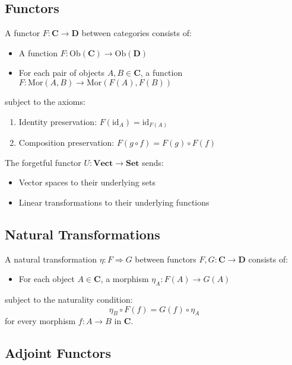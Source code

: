\subsection{Functors}

\begin{definition}[Functor]
A functor $F: \mathbf{C} \to \mathbf{D}$ between categories consists of:
\begin{itemize}
\item A function $F: \text{Ob}(\mathbf{C}) \to \text{Ob}(\mathbf{D})$
\item For each pair of objects $A, B \in \mathbf{C}$, a function $F: \text{Mor}(A, B) \to \text{Mor}(F(A), F(B))$
\end{itemize}
subject to the axioms:
\begin{enumerate}
\item Identity preservation: $F(\text{id}_A) = \text{id}_{F(A)}$
\item Composition preservation: $F(g \circ f) = F(g) \circ F(f)$
\end{enumerate}
\end{definition}

\begin{example}
The forgetful functor $U: \mathbf{Vect} \to \mathbf{Set}$ sends:
\begin{itemize}
\item Vector spaces to their underlying sets
\item Linear transformations to their underlying functions
\end{itemize}
\end{example}

\subsection{Natural Transformations}

\begin{definition}
A natural transformation $\eta: F \Rightarrow G$ between functors $F, G: \mathbf{C} \to \mathbf{D}$ consists of:
\begin{itemize}
\item For each object $A \in \mathbf{C}$, a morphism $\eta_A: F(A) \to G(A)$
\end{itemize}
subject to the naturality condition:
$$\eta_B \circ F(f) = G(f) \circ \eta_A$$
for every morphism $f: A \to B$ in $\mathbf{C}$.
\end{definition}

\subsection{Adjoint Functors}

